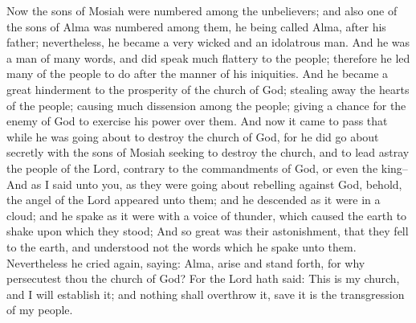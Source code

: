 Now the sons of Mosiah were numbered among the unbelievers; and also one of the sons of Alma was numbered among them, he being called Alma, after his father; nevertheless, he became a very wicked and an idolatrous man. And he was a man of many words, and did speak much flattery to the people; therefore he led many of the people to do after the manner of his iniquities.
\bverse \iffalse And he became a great hinderment to the prosperity of the church of God; stealing away the hearts of the people; causing much dissension among the people; giving a chance for the enemy of God to exercise his power over them. \fi
And he became a great hinderment to the prosperity of the church of God; stealing away the hearts of the people; causing much dissension among the people; giving a chance for the enemy of God to exercise his power over them.
\bverse \iffalse And now it came to pass that while he was going about to destroy the church of God, for he did go about secretly with the sons of Mosiah seeking to destroy the church, and to lead astray the people of the Lord, contrary to the commandments of God, or even the king-- \fi
And now it came to pass that while he was going about to destroy the church of God, for he did go about secretly with the sons of Mosiah seeking to destroy the church, and to lead astray the people of the Lord, contrary to the commandments of God, or even the king--
\bverse \iffalse And as I said unto you, as they were going about rebelling against God, behold, the angel of the Lord appeared unto them; and he descended as it were in a cloud; and he spake as it were with a voice of thunder, which caused the earth to shake upon which they stood; \fi
And as I said unto you, as they were going about rebelling against God, behold, the angel of the Lord appeared unto them; and he descended as it were in a cloud; and he spake as it were with a voice of thunder, which caused the earth to shake upon which they stood;
\bverse \iffalse And so great was their astonishment, that they fell to the earth, and understood not the words which he spake unto them. \fi
And so great was their astonishment, that they fell to the earth, and understood not the words which he spake unto them.
\bverse \iffalse Nevertheless he cried again, saying: Alma, arise and stand forth, for why persecutest thou the church of God? For the Lord hath said: This is my church, and I will establish it; and nothing shall overthrow it, save it is the transgression of my people. \fi
Nevertheless he cried again, saying: Alma, arise and stand forth, for why persecutest thou the church of God? For the Lord hath said: This is my church, and I will establish it; and nothing shall overthrow it, save it is the transgression of my people.
